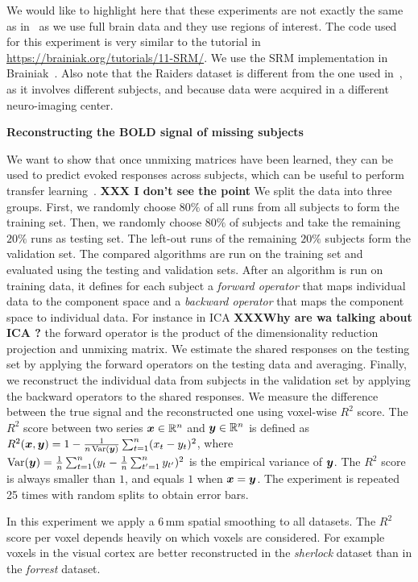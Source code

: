 We would like to highlight here that these experiments are not exactly the same as in~\cite{chen2015reduced} as we use full brain data and they use regions of interest. The code used for this experiment is very similar to the tutorial in \url{https://brainiak.org/tutorials/11-SRM/}. We use the SRM implementation in Brainiak~\cite{kumar2020brainiak}. Also note that the Raiders dataset is different from the one used in~\cite{chen2015reduced}, as it involves different subjects, and because data were acquired in a different neuro-imaging center.

\textbf{Reconstructing the BOLD signal of missing subjects}
\label{sec:srm:reconstruction}

We want to show that once unmixing matrices have been learned, they can be
used to predict
evoked responses across subjects, which can be useful to perform transfer learning~\cite{zhang2018transfer}. \textbf{XXX I don't see the point}
%
We split the data into three groups. First, we randomly choose $80\%$ of all runs from all subjects to form the training set.
%
Then, we randomly choose $80\%$ of subjects and take the remaining $20\%$  runs as testing set.
%
The left-out runs  of the remaining $20\%$ subjects form the validation set.
%
The compared algorithms are run on the training set and evaluated using the testing and validation sets.
%
After an algorithm is run on training data, it defines for each subject a \emph{forward operator} that maps individual data to the component space and a \emph{backward operator} that maps the component space to individual data. For instance in ICA \textbf{XXXWhy are wa talking about ICA ?} the forward operator is the product of the dimensionality reduction projection and unmixing matrix.
%
We estimate the shared responses on the testing set by applying the forward operators on the testing data and averaging. Finally, we reconstruct the individual data from subjects in the validation set by applying the backward operators to the shared responses. We measure the difference between the true signal and the reconstructed one using voxel-wise $R^2$ score. The $R^2$ score between two series $\boldsymbol{x} \in \mathbb{R}^n$ and $\boldsymbol{y} \in \mathbb{R}^n$ is defined as
$R^2(\boldsymbol{x}, \boldsymbol{y}) = 1 - \frac1{n\operatorname*{Var}(\boldsymbol{y})}\sum_{t=1}^n (x_t - y_t)^2$, where $\operatorname*{Var}(\boldsymbol{y}) = \frac1n\sum_{t=1}^n (y_t - \frac1n \sum_{t'=1}^n y_{t'})^2$ is the empirical variance of $\boldsymbol{y}$.
%
The $R^2$ score is always smaller than $1$, and equals $1$ when $\boldsymbol{x}= \boldsymbol{y}$.
The experiment is repeated 25 times with random splits to obtain error bars.


In this experiment we apply a 6\,mm spatial smoothing to all datasets. The $R^2$ score per
voxel depends heavily on which voxels are considered. For example voxels in the
visual cortex are better reconstructed in the \emph{sherlock} dataset than in
the \emph{forrest} dataset.

